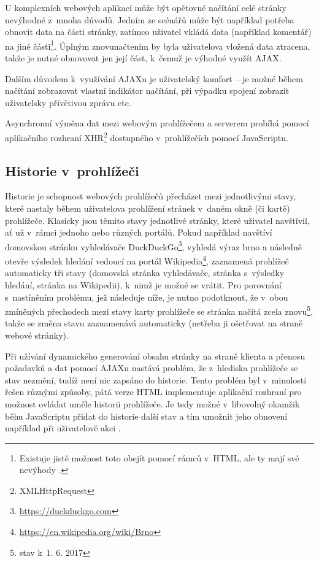 \documentclass[a4paper, 11pt, oneside, showtrims]{book}
\newcommand\ex{\textsf}
\begin{document}
					U komplexních webových aplikací může být opětovné načítání celé stránky nevýhodné z~mnoha důvodů. Jedním ze scénářů může být například potřeba obnovit data na části stránky, zatímco uživatel vkládá data (například komentář) na jiné části\footnote{Existuje jistě možnost toto obejít pomocí rámců v~HTML, ale ty mají své nevýhody \parencite{frames2013bad}.}. Úplným znovunačtením by byla uživatelova vložená data ztracena, takže je nutné obnovovat jen její část, k~čemuž je výhodné využít AJAX.

					Dalším důvodem k~využívání AJAXu je uživatelský komfort -- je možné během načítání zobrazovat vlastní indikátor načítání, při výpadku spojení zobrazit uživatelsky přívětivou zprávu etc.

					Asynchronní výměna dat mezi webovým prohlížečem a serverem probíhá pomocí aplikačního rozhraní XHR\footnote{XMLHttpRequest} dostupného v~prohlížečích pomocí JavaScriptu. \parencite{mozilla2017XMLHTTP}

				\subsection{Historie v~prohlížeči}

					Historie je schopnost webových prohlížečů přecházet mezi jednotlivými stavy, které nastaly během uživatelova prohlížení stránek v~daném okně (či kartě) prohlížeče. Klasicky jsou těmito stavy jednotlivé stránky, které uživatel navštívil, ať už v~rámci jednoho nebo různých portálů. Pokud například navštíví domovskou stránku vyhledávače DuckDuckGo\footnote{\url{https://duckduckgo.com}}, vyhledá výraz \ex{brno} a následně otevře výsledek hledání vedoucí na portál Wikipedia\footnote{\url{https://en.wikipedia.org/wiki/Brno}}, zaznamená prohlížeč automaticky tři stavy (domovská stránka vyhledávače, stránka s~výsledky hledání, stránka na Wikipedii), k~nimž je možné se vrátit. Pro porovnání s~nastíněním problému, jež následuje níže, je nutno podotknout, že v~obou zmíněných přechodech mezi stavy karty prohlížeče se stránka načítá zcela znovu\footnote{stav k~1. 6. 2017}, takže se změna stavu zaznamenává automaticky (netřeba ji ošetřovat na straně webové stránky).

					Při užívání dynamického generování obsahu stránky na straně klienta a přenosu požadavků a dat pomocí AJAXu nastává problém, že z~hlediska prohlížeče se stav nezmění, tudíž není nic zapsáno do historie. Tento problém byl v~minulosti řešen různými způsoby, pátá verze HTML implementuje aplikační rozhraní pro možnost ovládat uměle historii prohlížeče. Je tedy možné v~libovolný okamžik běhu JavaScriptu přidat do historie další stav a tím umožnit jeho obnovení například při uživatelově akci .
\end{document}
